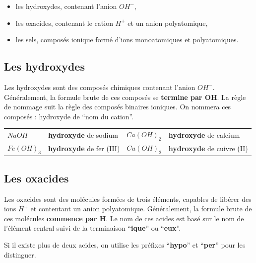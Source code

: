 \documentclass[
  11pt,
  a4paper,
  openany]{book}
\providecommand{\tightlist}{%
  \setlength{\itemsep}{0pt}\setlength{\parskip}{0pt}}
\begin{document}
\begin{itemize}
\tightlist
\item
  les hydroxydes, contenant l'anion \(OH^-\),
\item
  les oxacides, contenant le cation \(H^+\) et un anion polyatomique,
\item
  les sels, composés ionique formé d'ions monoatomiques et polyatomiques.
\end{itemize}

\hypertarget{les-hydroxydes}{%
\subsection{Les hydroxydes}\label{les-hydroxydes}}

Les hydroxydes sont des composés chimiques contenant l'anion \(OH^-\). Généralement, la formule brute de ces composés se \textbf{termine par OH}. La règle de nommage suit la règle des composés binaires ioniques. On nommera ces composés : hydroxyde de ``nom du cation''.

\begin{longtable}[]{@{}
  >{\centering\arraybackslash}p{}
  >{\raggedright\arraybackslash}p{}
  >{\centering\arraybackslash}p{}
  >{\raggedright\arraybackslash}p{}@{}}
\toprule()
\endhead
\(NaOH\) & \textbf{hydroxyde} de sodium & \(Ca(OH)_2\) & \textbf{hydroxyde} de calcium \\
\(Fe(OH)_3\) & \textbf{hydroxyde} de fer (III) & \(Cu(OH)_2\) & \textbf{hydroxyde} de cuivre (II) \\
\bottomrule()
\end{longtable}

\hypertarget{les-oxacides}{%
\subsection{Les oxacides}\label{les-oxacides}}

Les oxacides sont des molécules formées de trois éléments, capables de libérer des ions \(H^+\) et contentant un anion polyatomique. Généralement, la formule brute de ces molécules \textbf{commence par H}. Le nom de ces acides est basé sur le nom de l'élément central suivi de la terminaison ``\textbf{ique}'' ou ``\textbf{eux}''.

Si il existe plus de deux acides, on utilise les préfixes ``\textbf{hypo}'' et ``\textbf{per}'' pour les distinguer.
\end{document}
